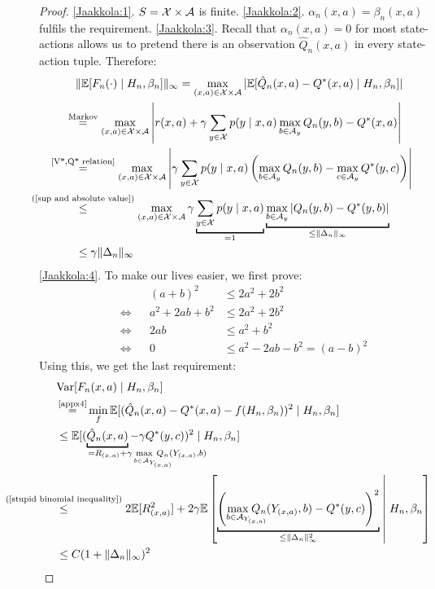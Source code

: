 \begin{proof}
    \ref{Jaakkola:1}. \(S=\mathcal{X}\times\mathcal{A}\) is finite.
    \ref{Jaakkola:2}. \(\alpha_n(x,a)=\beta_n(x,a)\) fulfils the requirement.
    \ref{Jaakkola:3}. Recall that \(\alpha_n(x,a)=0\) for most state-actions allows us to pretend there is an observation \(\hat{Q}_n(x,a)\) in every state-action tuple. Therefore:
    \begin{align*}
        &\|\E[F_n(\cdot)\mid H_n, \beta_n]\|_\infty
        =\max_{(x,a)\in\cX\times\cA} |\E[\hat{Q}_n(x,a)-Q^*(x,a)\mid H_n, \beta_n]|\\
        &\lxeq{\text{Markov}}\max_{(x,a)\in\cX\times\cA}
        \left|r(x,a)+\gamma\sum_{y\in\cX}p(y\mid x,a)\max_{b\in\cA_y}Q_n(y,b) -Q^*(x,a)\right|\\
        &\lxeq{\text{\ref{V*,Q* relation}}}\max_{(x,a)\in\cX\times\cA}
        \left|\gamma\sum_{y\in\cX}p(y\mid x,a)\left(
            \max_{b\in\cA_y}Q_n(y,b) - \max_{c\in\cA_y}Q^*(y,c) 
        \right)\right|\\
        &\lxlq{\text{(\ref{sup and absolute value})}} \max_{(x,a)\in\cX\times\cA} \gamma \underbracket[1pt]{\sum_{y\in\cX}p(y\mid x,a)}_{=1}  
        \underbracket[1pt]{
            \max_{b\in\cA_y}\left|Q_n(y,b)-Q^*(y,b)\right|
        }_{\le \|\Delta_n\|_\infty}\\
        &\le \gamma \|\Delta_n\|_\infty
    \end{align*}
\ref{Jaakkola:4}. To make our lives easier, we first prove:
\begin{align}
    && (a+b)^2 &\le 2a^2+2b^2 \label{stupid binomial inequality}\\
    \iff&& a^2+2ab +b^2 &\le 2a^2+2b^2\nonumber\\
    \iff&& 2ab &\le a^2 + b^2 \nonumber\\
    \iff&& 0 &\le a^2 -2ab -b^2 = (a-b)^2 \nonumber
\end{align}
Using this, we get the last requirement:
\begin{align*}
    &\text{Var}[F_n(x,a)\mid H_n,\beta_n]\\
    &\xeq{\text{\ref{appx4}}}\min_{f} \E[(\hat{Q}_n(x,a)-Q^*(x,a) -f(H_n,\beta_n))^2\mid H_n, \beta_n ]\\
    &\le \E[(\underbracket[1pt]{\hat{Q}_n(x,a)}_{
        =R_{(x,a)} + \mathrlap{\gamma \max\limits_{b\in\cA_{Y_{\mathrlap{(x,a)}}}}Q_n(Y_{(x,a)}, b)}
    }-\gamma Q^*(y,c))^2\mid H_n, \beta_n ]\\
    &\lxlq{\text{(\ref{stupid binomial inequality})}} 2\E[ R_{(x,a)}^2] 
    + 2\gamma \E\left[
        \underbracket[1pt]{
        \left(
            \max\limits_{b\in\cA_{Y_{\mathrlap{(x,a)}}}}
            Q_n(Y_{(x,a)}, b)-Q^*(y,c)
        \right)^2 
        }_{
        \le \|\Delta_n\|_\infty^2
    }\;\middle|\; H_n,\beta_n \right] \\
    &\le C(1+\|\Delta_n\|_\infty)^2\qedhere
\end{align*}
\end{proof}

